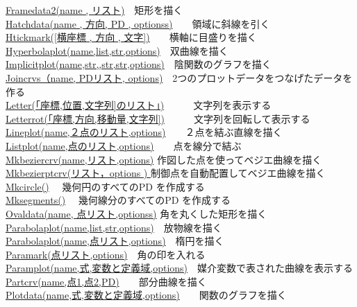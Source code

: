 \documentclass[papersize,a4paper,12pt,uplatex]{jsarticle}
\begin{document}
\begin{tabbing}
\hyperlink{framedata}{Framedata2(name , リスト)}　\>矩形を描く\\
\hyperlink{hatchdata}{Hatchdata(name , 方向, PD , optionss)}　　\>領域に斜線を引く\\
\hyperlink{htickmark}{Htickmark([横座標 , 方向 , 文字])}　　\>横軸に目盛りを描く\\
\hyperlink{hyperbolaplot}{Hyperbolaplot(name,list,str,options)}　\>双曲線を描く\\
\hyperlink{implicitplot}{Implicitplot(name,str,,str,str,options)}　\>陰関数のグラフを描く\\
\hyperlink{joincrvs}{Joincrvs（name, PDリスト, options)}　\>2つのプロットデータをつなげたデータを作る\\
\hyperlink{letter}{Letter(「座標,位置,文字列]のリスト」)}　　　\>文字列を表示する\\
\hyperlink{letterrot}{Letterrot(「座標,方向,移動量,文字列])}　　　\>文字列を回転して表示する\\
\hyperlink{lineplot}{Lineplot(name,２点のリスト,options)}　　\>２点を結ぶ直線を描く\\
\hyperlink{listplot}{Listplot(name,点のリスト,options)}　　\>点を線分で結ぶ\\
\hyperlink{mkbeziercrv}{Mkbeziercrv(name,リスト,options)}  \>作図した点を使ってベジエ曲線を描く\\
\hyperlink{mkbezierptcrv}{Mkbezierptcrv(リスト，options ) } \>制御点を自動配置してベジエ曲線を描く\\
\hyperlink{mkcircle}{Mkcircle()} 　\>幾何円のすべてのPD を作成する\\
\hyperlink{mksegments}{Mksegments()}　\> 幾何線分のすべてのPD を作成する\\
\hyperlink{ovaldata}{Ovaldata(name, 点リスト,optionss)}    \>角を丸くした矩形を描く\\
\hyperlink{parabolaplot}{Parabolaplot(name,list,str,options)}　\>放物線を描く\\
\hyperlink{parabolaplot}{Parabolaplot(name,点リスト,options)}　\>楕円を描く\\
\hyperlink{paramark}{Paramark(点リスト,options)}　\>角の印を入れる\\
\hyperlink{paramplot}{Paramplot(name,式,変数と定義域,options)}　\>媒介変数で表された曲線を表示する\\
\hyperlink{partcrv}{Partcrv(name,点1,点2,PD)}　　\>部分曲線を描く\\
\hyperlink{plotdata}{Plotdata(name,式,変数と定義域,options)}　　\>関数のグラフを描く\\

\end{tabbing}
\end{document}
